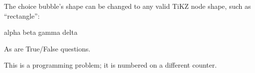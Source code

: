 \documentclass{dscproblemset}
\begin{document}
\begin{probset}
\begin{prob}
        The choice bubble's shape can be changed to any valid
        TiKZ node shape, such as ``rectangle'':

        \begin{choices}[rectangle]
            \choice alpha
            \correctchoice beta
            \choice gamma
            \choice delta
        \end{choices}
    \end{prob}

    \begin{prob}
        As are True/False questions.

        \Tf{}

    \end{prob}

    \renewcommand{\progprobtext}{Coding Problem}

    \begin{progprob}
        This is a programming problem; it is numbered on a different counter.

    \end{progprob}

\end{probset}

\scratchpage{}
\end{document}
